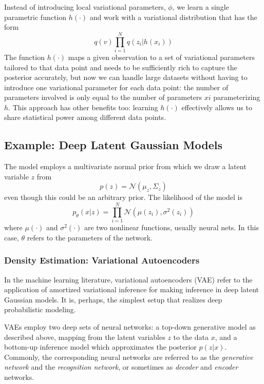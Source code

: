 Instead of introducing local variational parameters, $\phi$, we learn a single parametric function $h(\cdot)$ and work with a variational distribution that has the form
$$q(v)\prod_{i=1}^N q(z_i|h(x_i))$$
The function $h(\cdot)$ maps a given observation to a set of variational parameters tailored to that data point and needs to be sufficiently rich to capture the posterior accurately, but now we can handle large datasets without having to introduce one variational parameter for each data point: the number of parameters involved is only equal to the number of parameters $xi$ parameterizing $h$. This approach has other benefits too: learning $h(\cdot)$ effectively allows us to share statistical power among different data points.





\subsection{Example: Deep Latent Gaussian Models}\label{sec:vae}
The model employs a multivariate normal prior from which we draw a latent variable $z$ from
$$p(z) = \mathcal{N}\left(\mu_z, \Sigma_z\right)$$
even though this could be an arbitrary prior.
The likelihood of the model is
$$p_\theta(x|z) = \prod_{i=1}^{N} \mathcal{N}\left(\mu(z_i), \sigma^2(z_i)\right)$$
where $\mu(\cdot)$ and $\sigma^2(\cdot)$ are two nonlinear functions, usually neural nets. In this case, $\theta$ refers to the parameters of the network.



\subsubsection*{Density Estimation: Variational Autoencoders} In the machine learning literature, variational autoencoders (VAE) refer to the application of amortized variational inference for making inference in deep latent Gaussian models. It is, perhaps, the simplest setup that realizes deep probabilistic modeling. 

VAEs employ two deep sets of neural networks: a top-down generative model as described above, mapping from the latent variables $z$ to the data $x$, and a bottom-up inference model which approximates the posterior $p(z|x)$. Commonly, the corresponding neural networks are referred to as the \textit{generative network} and the \textit{recognition network}, or sometimes as \textit{decoder} and \textit{encoder} networks. 

